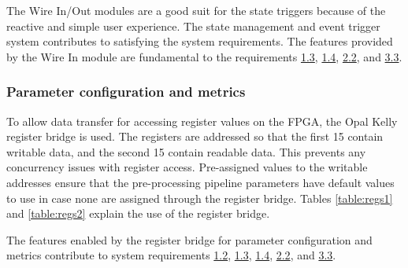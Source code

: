 \documentclass[12pt]{report}
\begin{document}
The Wire In/Out modules are a good suit for the state triggers because of the reactive and simple user experience.
The state management and event trigger system contributes to satisfying the system requirements. The features provided by the Wire In module are fundamental to the requirements \hyperref[req1.3]{1.3}, \hyperref[req1.4]{1.4}, \hyperref[req2.2]{2.2}, and \hyperref[req3.3]{3.3}.

\subsubsection{Parameter configuration and metrics}
To allow data transfer for accessing register values on the FPGA, the Opal Kelly register bridge is used. The registers are addressed so that the first 15 contain writable data, and the second 15 contain readable data. This prevents any concurrency issues with register access. Pre-assigned values to the writable addresses ensure that the pre-processing pipeline parameters have default values to use in case none are assigned through the register bridge. Tables \ref{table:regs1} and \ref{table:regs2} explain the use of the register bridge. \citep{stpp}
\par
The features enabled by the register bridge for parameter configuration and metrics contribute to system requirements \hyperref[req1.2]{1.2}, \hyperref[req1.3]{1.3}, \hyperref[req1.4]{1.4}, \hyperref[req2.2]{2.2}, and \hyperref[req3.3]{3.3}.
\end{document}
